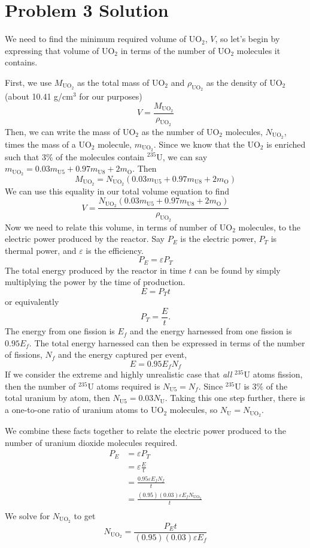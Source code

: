 \section*{Problem 3 Solution}

We need to find the minimum required volume of UO$_2$, $V$, so let's begin by expressing that volume of UO$_2$ in terms of the number of UO$_2$ molecules it contains. 

First, we use $M_{\text{UO}_2}$ as the total mass of UO$_2$ and $\rho_{\text{UO}_2}$ as the density of UO$_2$ (about 10.41 g/cm$^3$ for our purposes)
$$ V = \frac{M_{\text{UO}_2}}{\rho_{\text{UO}_2}} $$
Then, we can write the mass of UO$_2$ as the number of UO$_2$ molecules, $N_{\text{UO}_2}$, times the mass of a UO$_2$ molecule, $m_{\text{UO}_2}$. Since we know that the UO$_2$ is enriched such that 3\% of the molecules contain $^{235}$U, we can say $m_{\text{UO}_2} = 0.03m_{\text{U5}} + 0.97m_{\text{U8}} + 2m_{\text{O}}$. Then
$$ M_{\text{UO}_2} = N_{\text{UO}_2}(0.03m_{\text{U5}} + 0.97m_{\text{U8}} + 2m_{\text{O}}) $$
We can use this equality in our total volume equation to find
\begin{equation}
\label{vol}
V = \frac{N_{\text{UO}_2}(0.03m_{\text{U5}} + 0.97m_{\text{U8}} + 2 m_{\text{O}})}{\rho_{\text{UO}_2}}
\end{equation}
Now we need to relate this volume, in terms of number of UO$_2$ molecules, to the electric power produced by the reactor. Say $P_E$ is the electric power, $P_T$ is thermal power, and $\varepsilon$ is the efficiency. 
$$ P_E = \varepsilon P_T $$
The total energy produced by the reactor in time $t$ can be found by simply multiplying the power by the time of production.
$$ E = P_T t $$
or equivalently
$$ P_T = \frac{E}{t} .$$
The energy from one fission is $E_f$ and the energy harnessed from one fission is $0.95E_f$. The total energy harnessed can then be expressed in terms of the number of fissions, $N_f$ and the energy captured per event,
$$ E = 0.95E_f N_f $$
If we consider the extreme and highly unrealistic case that \textit{all} $^{235}$U atoms fission, then the number of $^{235}$U atoms required is $N_{\text{U5}} = N_f$. Since $^{235}$U is 3\% of the total uranium by atom, then $N_{\text{U5}} = 0.03N_{\text{U}}$. Taking this one step further, there is a one-to-one ratio of uranium atoms to UO$_2$ molecules, so $N_{\text{U}} = N_{\text{UO}_2}$.

We combine these facts together to relate the electric power produced to the number of uranium dioxide molecules required.
\begin{align*} 
P_E	&= \varepsilon P_T \\
	&= \varepsilon \frac{E}{t} \\
	&= \frac{0.95\varepsilon E_f N_f}{t} \\
	&= \frac{(0.95)(0.03)\varepsilon E_f N_{\text{UO}_2}}{t} \\
\end{align*}
We solve for $N_{\text{UO}_2}$ to get
\begin{equation}
\label{num}
N_{\text{UO}_2} = \frac{P_E t}{(0.95)(0.03)\varepsilon E_f}
\end{equation}

